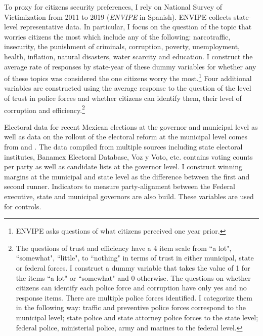 \documentclass[12pt]{amsart}
\numberwithin{equation}{section}
\theoremstyle{definition}
\theoremstyle{definition}
\theoremstyle{definition}
\begin{document}
To proxy for citizens security preferences, I rely on National Survey of Victimization from 2011 to 2019 (\emph{ENVIPE} in Spanish). ENVIPE collects state-level representative data.  In particular, I focus on the question of the topic that worries citizens the most which include any of the following: narcotraffic, insecurity, the punishment of criminals, corruption, poverty, unemployment, health, inflation, natural disasters, water scarcity and education. I construct the average rate of responses by state-year of these dummy variables for whether any of these topics was considered the one citizens worry the most.\footnote{ENVIPE asks questions of what citizens perceived one year prior.} Four additional variables are constructed using the average response to the question of the level of trust in police forces and whether citizens can identify them, their level of corruption and efficiency.\footnote{The questions of trust and efficiency have a 4 item scale from ``a lot", ``somewhat", ``little", to  ``nothing" in terms of trust in either municipal, state or federal forces. I construct a dummy variable that takes the value of 1 for the items ``a lot" or ``somewhat" and 0 otherwise. The questions on whether citizens can identify each police force and corruption have only yes and no response items. There are multiple police forces identified. I categorize them in the following way: traffic and preventive police forces correspond to the municipal level; state police and state attorney police forces to the state level; federal police, ministerial police, army and marines to the federal level.} 
 
Electoral data for recent Mexican elections at the governor and municipal level as well as data on the rollout of the electoral reform at the municipal level comes from \citet{magar_2012} and \citet{magar_2017}. The data compiled from multiple sources including state electoral institutes, Banamex Electoral Database, Voz y Voto, etc. contains voting counts per party as well as candidate lists at the governor level. I construct winning margins at the municipal and state level as the difference between the first and second runner.  Indicators to measure party-alignment between the Federal executive, state and municipal governors are also build. These variables are used for controls. 
\end{document}

